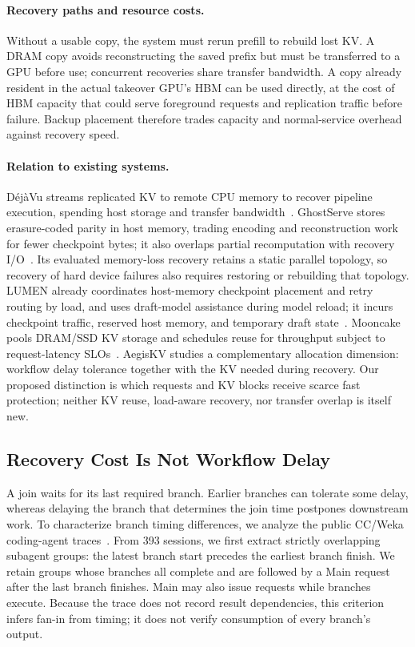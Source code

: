 \paragraph{Recovery paths and resource costs.}
Without a usable copy, the system must rerun prefill to rebuild lost KV.
A DRAM copy avoids reconstructing the saved prefix but must be transferred
to a GPU before use; concurrent recoveries share transfer bandwidth.
A copy already resident in the actual takeover GPU's HBM can be used
directly, at the cost of HBM capacity that could serve foreground requests
and replication traffic before failure. Backup placement therefore trades
capacity and normal-service overhead against recovery speed.

\paragraph{Relation to existing systems.}
D\'{e}j\`{a}Vu streams replicated KV to remote CPU memory to recover
pipeline execution, spending host storage and transfer
bandwidth~\cite{strati2024dejavu}. GhostServe stores erasure-coded parity
in host memory, trading encoding and reconstruction work for fewer
checkpoint bytes; it also overlaps partial recomputation with recovery
I/O~\cite{jayakody2026ghostserve}. Its evaluated memory-loss recovery
retains a static parallel topology, so recovery of hard device failures
also requires restoring or rebuilding that topology.
LUMEN already coordinates host-memory checkpoint placement and retry
routing by load, and uses draft-model assistance during model reload;
it incurs checkpoint traffic, reserved host memory, and temporary draft
state~\cite{cao2026lumen}. Mooncake pools DRAM/SSD KV storage and schedules
reuse for throughput subject to request-latency SLOs~\cite{qin2025mooncake}.
AegisKV studies a complementary allocation dimension: workflow delay
tolerance together with the KV needed during recovery. Our proposed
distinction is which requests and KV blocks receive scarce fast protection;
neither KV reuse, load-aware recovery, nor transfer overlap is itself new.

\subsection{Recovery Cost Is Not Workflow Delay}
\label{sec:motivation-workflow}

A join waits for its last required branch. Earlier branches can tolerate
some delay, whereas delaying the branch that determines the join time
postpones downstream work. To characterize branch timing differences, we
analyze the public CC/Weka coding-agent
traces~\cite{semianalysis2026cctraces}. From 393 sessions, we first extract
strictly overlapping subagent groups: the latest branch start precedes
the earliest branch finish. We retain groups whose branches all complete
and are followed by a Main request after the last branch finishes.
Main may also issue requests while branches execute. Because the trace
does not record result dependencies, this criterion infers fan-in from
timing; it does not verify consumption of every branch's output.

